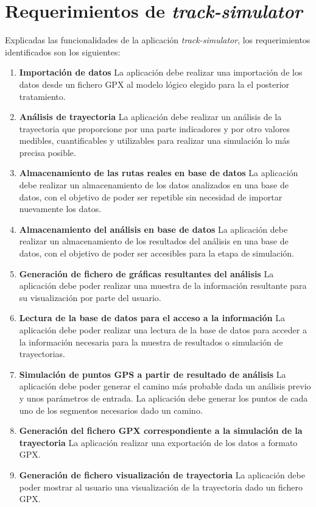 \section{Requerimientos de \textit{track-simulator}} \label{section: 
RequerimientosTrackSimulator}
Explicadas las funcionalidades de la aplicación \textit{track-simulator}, los 
requerimientos identificados son los siguientes:
\begin{enumerate}[label={R.\arabic*.}]

\item \textbf{Importación de datos} La aplicación debe realizar una importación de los 
datos desde un fichero \ac{GPX} al modelo lógico elegido para la el posterior 
tratamiento.

\item \textbf{Análisis de trayectoria} La aplicación debe realizar un análisis de la 
trayectoria que proporcione por una parte indicadores y por otro valores medibles, 
cuantificables y utilizables para realizar una simulación 
lo más precisa posible.

\item \textbf{Almacenamiento de las rutas reales en base de datos} La aplicación debe 
realizar un almacenamiento de los datos analizados en una base de datos, con el 
objetivo de poder ser repetible
sin necesidad de importar nuevamente los datos.

\item \textbf{Almacenamiento del análisis en base de datos} La aplicación debe realizar 
un almacenamiento de los resultados del análisis en una base de datos, con el objetivo 
de poder ser accesibles para la
etapa de simulación.

\item \textbf{Generación de fichero de gráficas resultantes del análisis}  La aplicación 
debe poder realizar una muestra de la información resultante para su visualización por 
parte del usuario.

\item \textbf{Lectura de la base de datos para el acceso a la información} La aplicación 
debe poder realizar una lectura de la base de datos para acceder a la información 
necesaria para la muestra de resultados o 
simulación de trayectorias.

\item \textbf{Simulación de puntos \ac{GPS} a partir de resultado de análisis} La 
aplicación debe poder generar el camino más probable dada un análisis previo y unos 
parámetros de entrada. La aplicación debe generar los puntos de cada uno de los 
segmentos necesarios dado un camino.

\item \textbf{Generación del fichero GPX correspondiente a la simulación de la 
trayectoria}  La aplicación realizar una exportación de los datos a formato \ac{GPX}.

\item \textbf{Generación de fichero visualización de trayectoria}  La aplicación debe 
poder mostrar al usuario una visualización de la trayectoria dado un fichero \ac{GPX}.
\end{enumerate}

